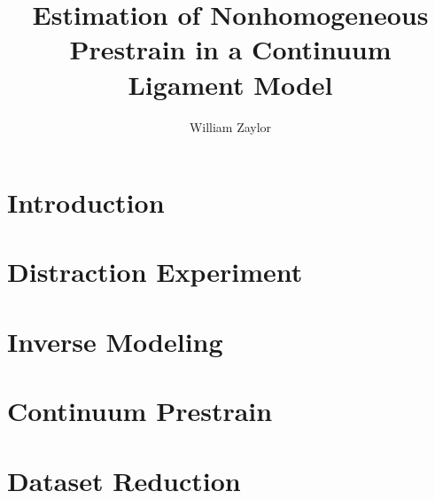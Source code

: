 \documentclass{report}
\author{William Zaylor}
\title{Estimation of Nonhomogeneous Prestrain in a Continuum Ligament Model}
\begin{document}
\maketitle

\chapter{Introduction}


\chapter{Distraction Experiment}


\chapter{Inverse Modeling}


\chapter{Continuum Prestrain}


\chapter{Dataset Reduction}



\end{document}
